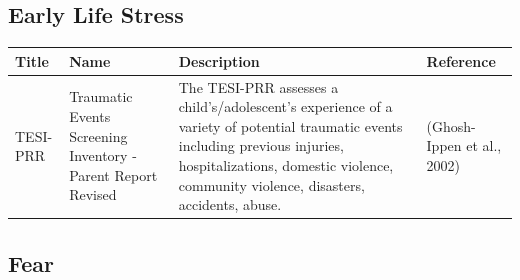 \documentclass[]{book}
\begin{document}
\hypertarget{early-life-stress}{%
\subsection{Early Life Stress}\label{early-life-stress}}

\begin{longtable}[]{@{}llll@{}}
\toprule
\begin{minipage}[b]{0.22\columnwidth}\raggedright
Title\strut
\end{minipage} & \begin{minipage}[b]{0.27\columnwidth}\raggedright
Name\strut
\end{minipage} & \begin{minipage}[b]{0.22\columnwidth}\raggedright
Description\strut
\end{minipage} & \begin{minipage}[b]{0.18\columnwidth}\raggedright
Reference\strut
\end{minipage}\tabularnewline
\midrule
\endhead
\begin{minipage}[t]{0.22\columnwidth}\raggedright
TESI-PRR\strut
\end{minipage} & \begin{minipage}[t]{0.27\columnwidth}\raggedright
Traumatic Events Screening Inventory - Parent Report Revised\strut
\end{minipage} & \begin{minipage}[t]{0.22\columnwidth}\raggedright
The TESI-PRR assesses a child's/adolescent's experience of a variety of potential traumatic events including previous injuries, hospitalizations, domestic violence, community violence, disasters, accidents, abuse.\strut
\end{minipage} & \begin{minipage}[t]{0.18\columnwidth}\raggedright
(Ghosh-Ippen et al., 2002)\strut
\end{minipage}\tabularnewline
\bottomrule
\end{longtable}

\hypertarget{fear}{%
\subsection{Fear}\label{fear}}
\end{document}
